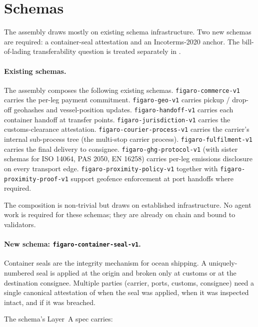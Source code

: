\documentclass[11pt,a4paper]{article}
\theoremstyle{definition}
\theoremstyle{remark}
\begin{document}
\section{Schemas}
\label{sec:schemas}

The assembly draws mostly on existing schema infrastructure. Two
new schemas are required: a container-seal attestation and an
Incoterms-2020 anchor. The bill-of-lading transferability
question is treated separately in .

\paragraph{Existing schemas.}
The assembly composes the following existing schemas.
\texttt{figaro-commerce-v1} carries the per-leg payment
commitment.
\texttt{figaro-geo-v1} carries pickup / drop-off geohashes and
vessel-position updates.
\texttt{figaro-handoff-v1} carries each container handoff at
transfer points.
\texttt{figaro-jurisdiction-v1} carries the customs-clearance
attestation.
\texttt{figaro-courier-process-v1} carries the carrier's
internal sub-process tree (the multi-stop carrier process).
\texttt{figaro-fulfilment-v1} carries the final delivery to
consignee.
\texttt{figaro-ghg-protocol-v1} (with sister schemas for ISO
14064, PAS 2050, EN 16258) carries per-leg emissions
disclosure on every transport edge.
\texttt{figaro-proximity-policy-v1} together with
\texttt{figaro-proximity-proof-v1} support geofence enforcement
at port handoffs where required.

The composition is non-trivial but draws on established
infrastructure. No agent work is required for these schemas;
they are already on chain and bound to validators.

\paragraph{New schema: \texttt{figaro-container-seal-v1}.}
Container seals are the integrity mechanism for ocean shipping.
A uniquely-numbered seal is applied at the origin and broken only
at customs or at the destination consignee. Multiple parties
(carrier, ports, customs, consignee) need a single canonical
attestation of when the seal was applied, when it was inspected
intact, and if it was breached.

The schema's Layer~A spec carries:
\end{document}
